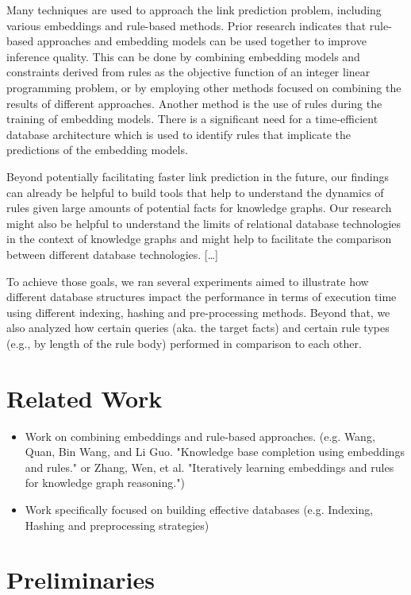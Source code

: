 \documentclass[runningheads]{llncs}
\begin{document}
Many techniques are used to approach the link prediction problem, including various embeddings and rule-based methods. Prior research indicates that rule-based approaches and embedding models can be used together to improve inference quality. This can be done by combining embedding models and constraints derived from rules as the objective function of an integer linear programming problem, or by employing other methods focused on combining the results of different approaches. Another method is the use of rules during the training of embedding models. There is a significant need for a time-efficient database architecture which is used to identify rules that implicate the predictions of the embedding models.

Beyond potentially facilitating faster link prediction in the future, our findings can already be helpful to build tools that help to understand the dynamics of rules given large amounts of potential facts for knowledge graphs. Our research might also be helpful to understand the limits of relational database technologies in the context of knowledge graphs and might help to facilitate the comparison between different database technologies. […]

To achieve those goals, we ran several experiments aimed to illustrate how different database structures impact the performance in terms of execution time using different indexing, hashing and pre-processing methods. Beyond that, we also analyzed how certain queries (aka. the target facts) and certain rule types (e.g., by length of the rule body) performed in comparison to each other.


\section{Related Work}
\begin{itemize}
  \item Work on combining embeddings and rule-based approaches. (e.g. Wang, Quan, Bin Wang, and Li Guo. "Knowledge base completion using embeddings and rules."\cite{ref_3} or Zhang, Wen, et al. "Iteratively learning embeddings and rules for knowledge graph reasoning."\cite{ref_4})
  \item Work specifically focused on building effective databases (e.g. Indexing, Hashing and preprocessing strategies)
\end{itemize}

\section{Preliminaries}
\end{document}
